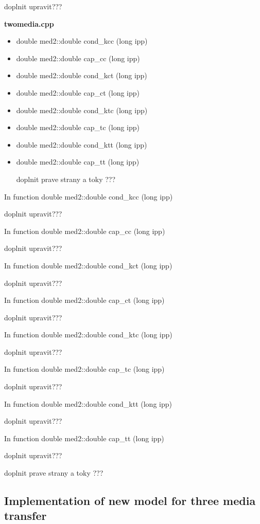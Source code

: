 doplnit upravit???


{\bf twomedia.cpp}\\
\begin{itemize}
\item {\sf double med2::double cond\_kcc (long ipp)}
\item {\sf double med2::double cap\_cc (long ipp)}
\item {\sf double med2::double cond\_kct (long ipp)}
\item {\sf double med2::double cap\_ct (long ipp)}
\item {\sf double med2::double cond\_ktc (long ipp)}
\item {\sf double med2::double cap\_tc (long ipp)}
\item {\sf double med2::double cond\_ktt (long ipp)}
\item {\sf double med2::double cap\_tt (long ipp)}

doplnit prave strany a toky ???

\end{itemize}

In function {\sf double med2::double cond\_kcc (long ipp)}

doplnit upravit???


In function {\sf double med2::double cap\_cc (long ipp)}

doplnit upravit???

In function {\sf double med2::double cond\_kct (long ipp)}

doplnit upravit???

In function {\sf double med2::double cap\_ct (long ipp)}

doplnit upravit???

In function {\sf double med2::double cond\_ktc (long ipp)}

doplnit upravit???

In function {\sf double med2::double cap\_tc (long ipp)}

doplnit upravit???

In function {\sf double med2::double cond\_ktt (long ipp)}

doplnit upravit???

In function {\sf double med2::double cap\_tt (long ipp)}

doplnit upravit???


doplnit prave strany a toky ???

\subsection{Implementation of new model for three media transfer}


